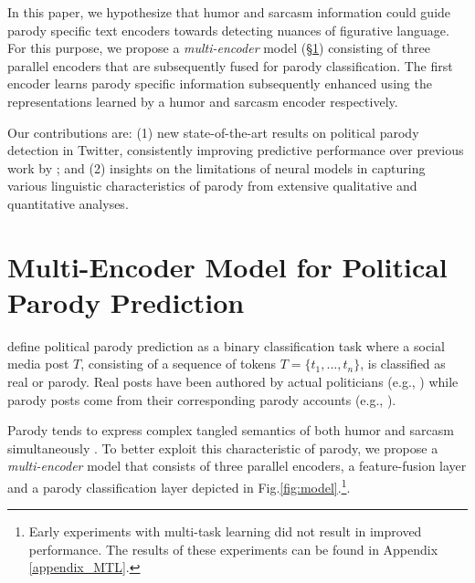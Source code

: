 \documentclass[11pt]{article}
\begin{document}
In this paper, we hypothesize that humor and sarcasm information could guide parody specific text encoders towards detecting nuances of figurative language. For this purpose, we propose a \emph{multi-encoder} model (\S \ref{sec:model}) consisting of three parallel encoders that are subsequently fused for parody classification. The first encoder learns parody specific information subsequently enhanced using the representations learned by a humor and sarcasm encoder respectively.

Our contributions are: (1) new state-of-the-art results on political parody detection in Twitter, consistently improving predictive performance over previous work by \citet{maronikolakis-etal-2020-analyzing}; and (2) insights on the limitations of neural models in capturing various linguistic characteristics of parody from extensive qualitative and quantitative analyses. 











\section{Multi-Encoder Model for Political Parody Prediction}
\label{sec:model}

\citet{maronikolakis-etal-2020-analyzing} define political parody prediction as a binary classification task where a social media post $T$, consisting of a sequence of tokens $T=\{t_1,...,t_n\}$, is classified as real or parody. Real posts have been authored by actual politicians (e.g., \texttt{\@realDonaldTrump}) while parody posts come from their corresponding parody accounts (e.g., \texttt{\@realDonaldTrFan}).  


Parody tends to express complex tangled semantics of both humor and sarcasm simultaneously \citep{haiman1998talk,Parody_Humor}. To better exploit this characteristic of parody, we propose a \emph{multi-encoder} model that consists of three parallel encoders, a feature-fusion layer and a parody classification layer depicted in Fig.\ref{fig:model}.\footnote{Early experiments with multi-task learning did not result in improved performance. The results of these experiments can be found in Appendix \ref{appendix_MTL}.}.
\end{document}
